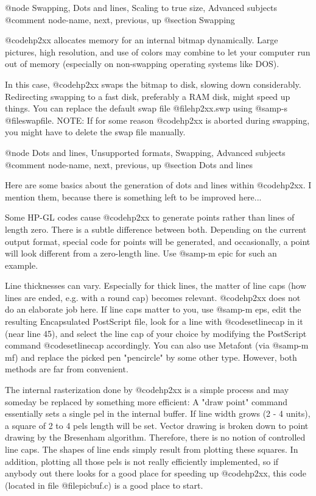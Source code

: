 @node Swapping, Dots and lines, Scaling to true size, Advanced subjects
@comment  node-name,  next,  previous,  up
@section Swapping

@code{hp2xx} allocates memory for an internal bitmap dynamically.
Large pictures, high resolution, and use of colors may combine to
let your computer run out of memory (especially on non-swapping operating
systems like DOS).

In this case, @code{hp2xx} swaps the bitmap to disk, slowing down
considerably. Redirecting swapping to a fast disk, preferably a RAM disk,
might speed up things. You can replace the default swap file
@file{hp2xx.swp} using @samp{-s @file{swapfile}}.
NOTE: If for some reason @code{hp2xx} is aborted during swapping, you might
have to delete the swap file manually.





@node Dots and lines, Unsupported formats, Swapping, Advanced subjects
@comment  node-name,  next,  previous,  up
@section Dots and lines

Here are some basics about the generation of dots and lines within
@code{hp2xx}. I mention them, because there is something left to be
improved here...

Some HP-GL codes cause @code{hp2xx} to generate points rather than lines
of length zero. There is a subtle difference between both. Depending
on the current output format, special code for points will be generated,
and occasionally, a point will look different from a zero-length line.
Use @samp{-m epic} for such an example.

Line thicknesses can vary. Especially for thick lines, the matter of
line caps (how lines are ended, e.g. with a round cap) becomes relevant.
@code{hp2xx} does not do an elaborate job here. If line caps matter to you,
use @samp{-m eps}, edit the resulting Encapsulated PostScript file, look
for a line with @code{setlinecap} in it (near line 45), and select the
line cap of your choice by modifying the PostScript command @code{setlinecap}
accordingly. You can also use Metafont (via @samp{-m mf}) and replace
the picked pen "pencircle" by some other type. However, both methods
are far from convenient.

The internal rasterization done by @code{hp2xx} is a simple process
and may someday be replaced by something more efficient: A "draw point"
command essentially sets a single pel in the internal buffer.
If line width grows (2 - 4 units), a square of 2 to 4 pels length will
be set. Vector drawing is broken down to point drawing by the
Bresenham algorithm. Therefore, there is no notion of controlled
line caps. The shapes of line ends simply result from plotting these squares.
In addition, plotting all those pels is not really efficiently implemented,
so if anybody out there looks for a good place for speeding up @code{hp2xx},
this code (located in file @file{picbuf.c}) is a good place to start.

